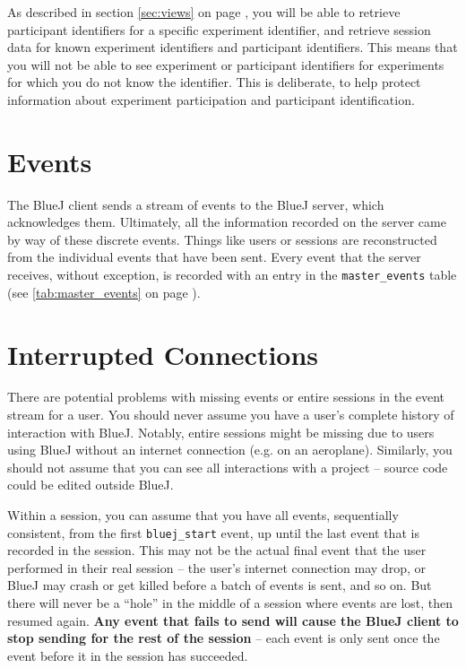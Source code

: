 \documentclass{report}
\newcommand{\myref}[1]{\autoref{#1} on page \pageref*{#1}}
\newcommand{\tabref}[1]{\lstinline|#1| table (see \myref{tab:#1})}
\begin{document}
As described in section \myref{sec:views}, you will be able to retrieve
participant identifiers for a specific experiment identifier, and retrieve
session data for known experiment identifiers and participant identifiers.
This means that you will not be able to see experiment or participant
identifiers for experiments for which you do  not know the identifier.  This
is deliberate, to help protect information about experiment participation and
participant identification.

\section{Events}

The BlueJ client sends a stream of events to the BlueJ server, which
acknowledges them.  Ultimately, all the information recorded on the server
came by way of these discrete events.  Things like users or sessions are
reconstructed from the individual events that have been sent.  Every event
that the server receives, without exception, is recorded with an entry in the \tabref{master_events}.

\section{Interrupted Connections}
\label{def:interruption}

There are potential problems with missing events or entire sessions in the
event stream for a user.  You should
never assume you have a user's complete history of interaction with BlueJ.
Notably, entire sessions might be missing due to users using BlueJ without an
internet connection (e.g. on an aeroplane).  Similarly, you should not assume
that you can see all interactions with a project -- source code could be
edited outside BlueJ.

Within a session, you can assume that you have all events, sequentially
consistent, from the first \texttt{bluej\_start} event, up until the last
event that is recorded in the session.  This may not be the actual final event
that the user performed in their real session -- the user's
internet connection may drop, or BlueJ may crash or get killed before a batch of events
is sent, and so on.  But there will never be a ``hole'' in the middle of a
session where events are lost, then resumed again.  \textbf{Any event that fails to
send will cause the BlueJ client to stop sending for the rest of the session}
-- each event is only sent once the event before it in the session has succeeded.
\end{document}
